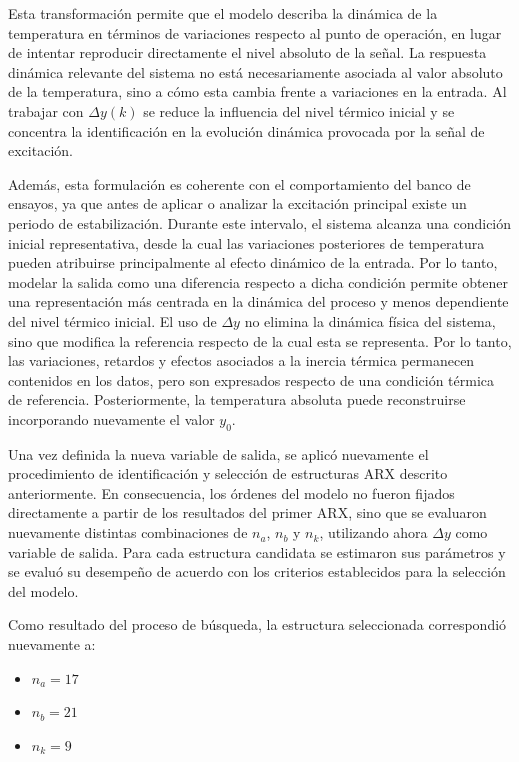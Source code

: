 \documentclass[11pt]{report}
\begin{document}
Esta transformación permite que el modelo describa la dinámica de la temperatura en términos de variaciones respecto al punto de operación, en lugar de intentar reproducir directamente el nivel absoluto de la señal. La respuesta dinámica relevante del sistema no está necesariamente asociada al valor absoluto de la temperatura, sino a cómo esta cambia frente a variaciones en la entrada. Al trabajar con $\Delta y(k)$ se reduce la influencia del nivel térmico inicial y se concentra la identificación en la evolución dinámica provocada por la señal de excitación.

Además, esta formulación es coherente con el comportamiento del banco de ensayos, ya que antes de aplicar o analizar la excitación principal existe un periodo de estabilización. Durante este intervalo, el sistema alcanza una condición inicial representativa, desde la cual las variaciones posteriores de temperatura pueden atribuirse principalmente al efecto dinámico de la entrada. Por lo tanto, modelar la salida como una diferencia respecto a dicha condición permite obtener una representación más centrada en la dinámica del proceso y menos dependiente del nivel térmico inicial.
El uso de $\Delta y$ no elimina la dinámica física del sistema, sino que modifica la referencia respecto de la cual esta se representa. Por lo tanto, las variaciones, retardos y efectos asociados a la inercia térmica permanecen contenidos en los datos, pero son expresados respecto de una condición térmica de referencia. Posteriormente, la temperatura absoluta puede reconstruirse incorporando nuevamente el valor $y_0$.

Una vez definida la nueva variable de salida, se aplicó nuevamente el procedimiento de identificación y selección de estructuras ARX descrito anteriormente. En consecuencia, los órdenes del modelo no fueron fijados directamente a partir de los resultados del primer ARX, sino que se evaluaron nuevamente distintas combinaciones de $n_a$, $n_b$ y $n_k$, utilizando ahora $\Delta y$ como variable de salida. Para cada estructura candidata se estimaron sus parámetros y se evaluó su desempeño de acuerdo con los criterios establecidos para la selección del modelo.

Como resultado del proceso de búsqueda, la estructura seleccionada correspondió nuevamente a:
\begin{itemize}
    \item $n_{a}=17$
    \item $n_{b}=21$
    \item $n_{k}=9$ 
\end{itemize}
\end{document}
